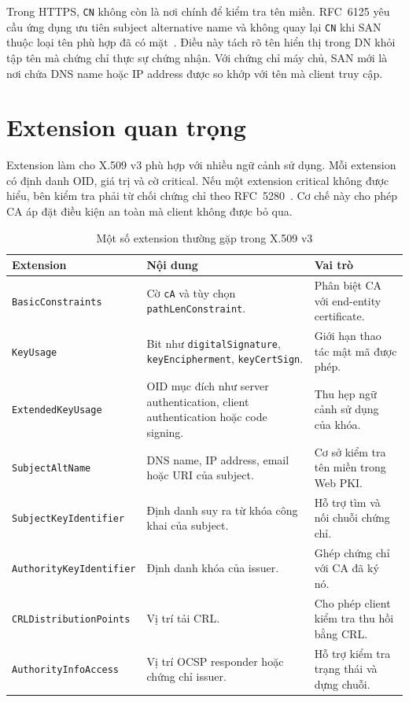 Trong HTTPS, \texttt{CN} không còn là nơi chính để kiểm tra tên
miền. RFC~6125 yêu cầu ứng dụng ưu tiên subject alternative name
và không quay lại \texttt{CN} khi SAN thuộc loại tên phù hợp đã có
mặt~\cite{RFC6125}. Điều này tách rõ tên hiển thị trong DN khỏi
tập tên mà chứng chỉ thực sự chứng nhận. Với chứng chỉ máy chủ,
SAN mới là nơi chứa DNS name hoặc IP address được so khớp với tên
mà client truy cập.

\section{Extension quan trọng}
\label{sec:4.4}

Extension làm cho X.509 v3 phù hợp với nhiều ngữ cảnh sử dụng.
Mỗi extension có định danh OID, giá trị và cờ critical. Nếu một
extension critical không được hiểu, bên kiểm tra phải từ chối
chứng chỉ theo RFC~5280~\cite{RFC5280}. Cơ chế này cho phép CA áp
đặt điều kiện an toàn mà client không được bỏ qua.

\begin{table}[ht]
    \centering
    \caption{Một số extension thường gặp trong X.509 v3}
    \label{tab:x509-extensions}
    \small
    \begin{tabularx}{\textwidth}{@{} p{}p{}p{} @{}}
        \toprule
        \textbf{Extension} & \textbf{Nội dung} & \textbf{Vai trò} \\
        \midrule
        \texttt{BasicConstraints}
            & Cờ \texttt{cA} và tùy chọn \texttt{pathLenConstraint}.
            & Phân biệt CA với end-entity certificate. \\
        \texttt{KeyUsage}
            & Bit như \texttt{digitalSignature}, \texttt{keyEncipherment},
              \texttt{keyCertSign}.
            & Giới hạn thao tác mật mã được phép. \\
        \texttt{ExtendedKeyUsage}
            & OID mục đích như server authentication, client authentication
              hoặc code signing.
            & Thu hẹp ngữ cảnh sử dụng của khóa. \\
        \texttt{SubjectAltName}
            & DNS name, IP address, email hoặc URI của subject.
            & Cơ sở kiểm tra tên miền trong Web PKI. \\
        \texttt{SubjectKeyIdentifier}
            & Định danh suy ra từ khóa công khai của subject.
            & Hỗ trợ tìm và nối chuỗi chứng chỉ. \\
        \texttt{AuthorityKeyIdentifier}
            & Định danh khóa của issuer.
            & Ghép chứng chỉ với CA đã ký nó. \\
        \texttt{CRLDistributionPoints}
            & Vị trí tải CRL.
            & Cho phép client kiểm tra thu hồi bằng CRL. \\
        \texttt{AuthorityInfoAccess}
            & Vị trí OCSP responder hoặc chứng chỉ issuer.
            & Hỗ trợ kiểm tra trạng thái và dựng chuỗi. \\
        \bottomrule
    \end{tabularx}
\end{table}

